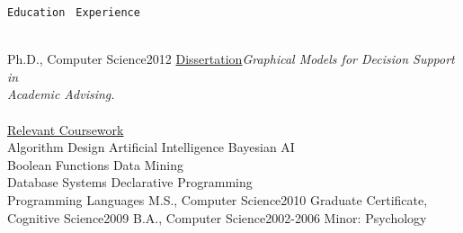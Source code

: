 \documentclass[
    10pt,
    A4,
    english,
    draft = false,
    twoside = false,
]{article}
\begin{document}
        \vspace{-5pt}
        {\textcolor{\thecolor}{\texttt{\Huge{E}\LARGE{ducation}\
} \hrulefill}}{\phantom{||||||}\textcolor{\thecolor}{\texttt{\Huge{E}\LARGE{xperience}\
} \hrulefill}}\\ \\
        \begin{minipage}[t]{0.49\textwidth}
	{Ph.D., Computer Science}{2012}
	{\underline{Dissertation}\newline \emph{Graphical Models for Decision Support in\\ Academic Advising.}\\\\
          \underline{Relevant Coursework}\\
        Algorithm Design \cvContactSep Artificial Intelligence \cvContactSep Bayesian AI \\ Boolean Functions \cvContactSep Data Mining  \\ Database Systems \cvContactSep Declarative Programming \\ Programming Languages}
        \vspace{-10pt}
        \CVBlockWithTime{}{}
	{M.S., Computer Science}{2010}
	{}
        \vspace{-20pt}
        \CVBlockWithTime{}{}
	{Graduate Certificate, Cognitive Science}{2009}
	{}
	{B.A., Computer Science}{2002-2006}
	{Minor: Psychology}
        \end{minipage}
\end{document}
